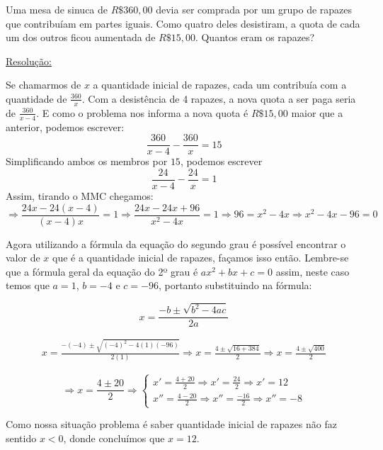 \begin{exem}
 Uma mesa de sinuca de $R\$ 360,00$ devia ser comprada por um grupo de rapazes que contribuíam em partes iguais. Como quatro deles desistiram, a quota de cada um dos outros ficou aumentada de $R\$ 15,00$. Quantos eram os rapazes?

 \underline{Resolução:}

 Se chamarmos de $x$ a quantidade inicial de rapazes, cada um contribuía com a quantidade de $\frac{360}{x}$. Com a desistência de 4 rapazes, a nova quota a ser paga seria de $\frac{360}{x - 4}$. E como o problema nos informa a nova quota é $R\$ 15,00$ maior que a anterior, podemos escrever:
 \[\frac{360}{x - 4} - \frac{360}{x} = 15\]
 Simplificando ambos os membros por $15$, podemos escrever
 \[\frac{24}{x - 4} - \frac{24}{x} = 1\]
 Assim, tirando o MMC chegamos:
 \begin{equation*}
  \Rightarrow \frac{24 x - 24(x-4)}{(x - 4)x} = 1 \Rightarrow \frac{24x - 24x + 96}{x^2 - 4x} = 1
  \Rightarrow 96 = x^2 - 4x \Rightarrow x^2 - 4x - 96 = 0
 \end{equation*}

 Agora utilizando a fórmula da equação do segundo grau é possível encontrar o valor de $x$ que é a quantidade inicial de rapazes, façamos isso então. Lembre-se que a fórmula geral da equação do 2º grau é $ax^2 + bx + c = 0$ assim, neste caso temos que $a = 1$, $b = -4$ e $c = -96$, portanto substituindo na fórmula:

 \[ x= \frac{-b \pm \sqrt{b^2 - 4ac}}{2a} \]

 \begin{eqnarray*}
  x= \frac{-(-4) \pm \sqrt{(-4)^2 - 4(1)(-96)}}{2(1)} \Rightarrow
  x = \frac{4 \pm \sqrt{16 + 384}}{2} \Rightarrow
  x = \frac{4 \pm \sqrt{400}}{2}
 \end{eqnarray*}

\[ \Rightarrow x = \frac{4 \pm 20}{2} \Rightarrow \begin{cases}
                                                  x' = \frac{4 + 20}{2} \Rightarrow x' = \frac{24}{2} \Rightarrow x' = 12 \\
                                                  x'' = \frac{4 - 20}{2} \Rightarrow x'' = \frac{-16}{2} \Rightarrow x'' = -8
                                                 \end{cases}\]

Como nossa situação problema é saber quantidade inicial de rapazes não faz sentido $x < 0$, donde concluímos que $x = 12$.
\fim
\end{exem}


